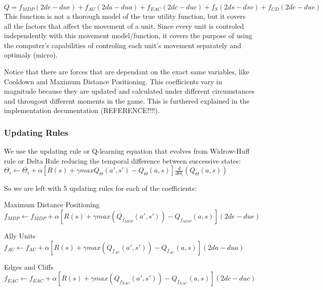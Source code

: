 $Q = f_{MDP} (2de - due) + f_{AU} (2da - dua) + f_{EAC} (2dc - duc) + f_{S}  (2ds - dsv) + f_{CD} (2de - due)$ \\ 

This function is not a thorough model of the true utility function, but it covers all the factors that affect the movement of a unit. Since every unit is controled independently with this movement model/function, it covers the purpose of using the computer's capabilities of controling each unit's movement separately and optimaly (micro).

Notice that there are forces that are dependant on the exact same variables, like Cooldown and Maximum Distance Positioning. This coefficients vary in magnitude because they are updated and calculated under different circumstances and througout different moments in the game. This is furthered explained in the implementation decumentation (REFERENCE!!!!). 

\subsubsection{Updating Rules}

We use the updating rule or Q-learning equation that evolves from Widrow-Huff rule or Delta Rule reducing the temporal difference between successive states:  \cite[p779]{rl} \\ 
 
$\Theta_i \leftarrow \Theta_i + \alpha [ R(s) + \gamma maxQ_\Theta(a',s')-Q_\Theta(a,s) ] \frac{d}{d\Theta_i}(Q_\Theta(a,s))$ \\ 
\begin{flushleft}
So we are left with 5 updating rules for each of the coefficients:
\end{flushleft} 

\begin{flushleft}
Maximum Distance Positioning 
$f_{MDP}  \leftarrow f_{MDP}  + \alpha [ R(s) + \gamma max(Q_f_{MDP} (a',s'))-Q_f_{MDP} (a,s) ](2de - due)$
\end{flushleft} 

\begin{flushleft}
Ally Units  \\ 
$f_{AU}  \leftarrow f_{AU} + \alpha [ R(s) + \gamma max(Q_f_{AU} (a',s'))-Q_f_{AU} (a,s) ](2da - dua)$ 
\end{flushleft} 

\begin{flushleft}
Edges and Cliffs
$f_{EAC}  \leftarrow f_{EAC}  + \alpha [ R(s) + \gamma max(Q_f_{EAC} (a',s'))-Q_f_{EAC} (a,s) ] (2dc - duc)$ 
\end{flushleft} 

